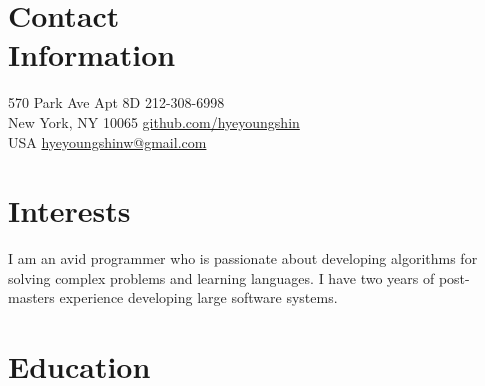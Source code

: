 \documentclass[margin,line]{resume}
\begin{document}
\newcommand{\Hawaii}{Hawai\kern.05em`\kern.05em\relax i}
\newcommand{\Manoa}{M\=anoa}

\begin{resume}

    \section{\mysidestyle Contact\\Information}
     570 Park Ave Apt 8D            \hfill    212-308-6998\\
     New York, NY 10065             \hfill    \href{https://github.com/hyeyoungshin}{github.com/hyeyoungshin}\\
     USA  \hfill                    \hfill    \href{mailto:hyeyoungshinw@gmail.com}{hyeyoungshinw@gmail.com}

    \section{\mysidestyle Interests}

    I am an avid programmer who is passionate about developing algorithms for solving complex problems and learning languages. I have two years of post-masters experience developing large software systems. 
    
    \section{\mysidestyle Education}

    \newcommand\mysmallskip{4pt}
    \newcommand\mymedskip{6pt}
    \newcommand\mybigskip{8pt}


\end{resume}
\end{document}
